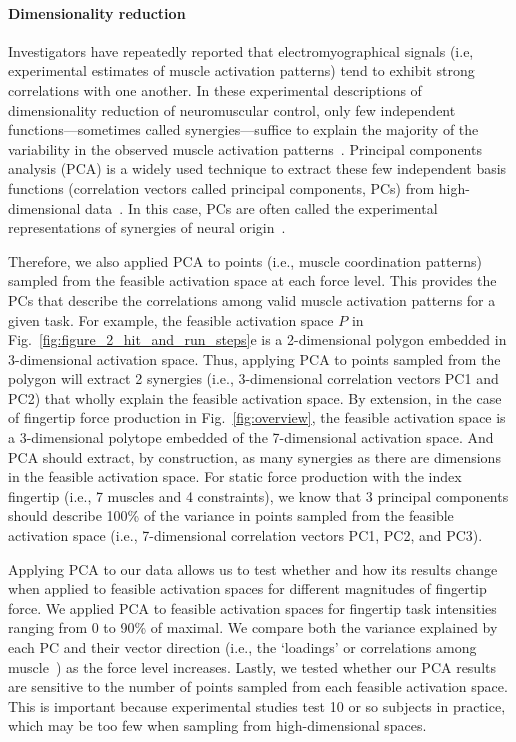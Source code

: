 \documentclass[9pt,twocolumn,twoside,lineno]{pnas-new}
\begin{document}
{\paragraph*{Dimensionality reduction}

Investigators have repeatedly reported that electromyographical signals (i.e, experimental estimates of muscle activation patterns) tend to exhibit strong correlations with one another.
In these experimental descriptions of dimensionality reduction of neuromuscular control, only few independent functions---sometimes called synergies---suffice to explain the majority of the variability in the observed muscle activation patterns~\cite{kutch2012challenges,steele2013number,bizzi2013neural,dingwell2010walkingvariability,steele2015consequences,alessandro2013musclesynergies,krishnamoorthy2003muscle}.
Principal components analysis (PCA) is a widely used technique to extract these few independent basis functions (correlation vectors called principal components, PCs) from high-dimensional data~\cite{Clewley2008Estimating}.
In this case, PCs are often called the experimental representations of synergies of neural origin~\cite{kutch2012challenges}.

Therefore, we also applied PCA to points (i.e., muscle coordination patterns) sampled from the feasible activation space at each force level.
This provides the PCs that describe the correlations among valid muscle activation patterns for a given task.
For example, the feasible activation space $P$ in Fig.~\ref{fig:figure_2_hit_and_run_steps}e is a 2-dimensional polygon embedded in 3-dimensional activation space. Thus, applying PCA to points sampled from the polygon will extract 2 synergies (i.e., 3-dimensional correlation vectors PC1 and PC2) that wholly explain the feasible activation space. By extension, in the case of fingertip force production in Fig.~\ref{fig:overview}, the feasible activation space is a 3-dimensional polytope embedded of the 7-dimensional activation space. And PCA should extract, by construction, as many synergies as there are dimensions in the feasible activation space. For static force production with the index fingertip (i.e., 7 muscles and 4 constraints), we know that 3 principal components should describe 100\% of the variance in points sampled from the feasible activation space (i.e., 7-dimensional correlation vectors PC1, PC2, and PC3).

Applying PCA to our data allows us to test whether and how its results change when applied to feasible activation spaces for different magnitudes of fingertip force. We applied PCA to feasible activation spaces for fingertip task intensities ranging from 0 to 90\% of maximal.
We compare both the variance explained by each PC and their vector direction (i.e., the `loadings' or correlations among muscle~\cite{valero2016robot}) as the force level increases.
Lastly, we tested whether our PCA results are sensitive to the number of points sampled from each feasible activation space. This is important because experimental studies test 10 or so subjects in practice, which may be too few when sampling from high-dimensional spaces.




}
\end{document}
